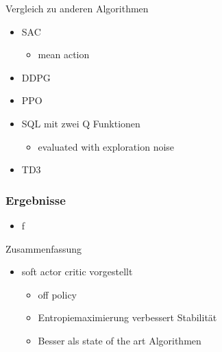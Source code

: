 \begin{frame}{Vergleich zu anderen Algorithmen}
    \begin{itemize}
        \item SAC
        \begin{itemize}
            \item mean action
        \end{itemize} 
        \item DDPG
        \item PPO
        \item SQL mit zwei Q Funktionen
        \begin{itemize}
            \item evaluated with exploration noise
        \end{itemize}
        \item TD3
    \end{itemize}
        
\end{frame}
\begin{frame}
    \frametitle{Ergebnisse}
    \begin{itemize}
        \item f
    \end{itemize}

    

\end{frame}


\begin{frame}{Zusammenfassung}
        \begin{itemize}
            \item soft actor critic vorgestellt
            \begin{itemize}
                \item off policy
                \item Entropiemaximierung verbessert Stabilität
                \item Besser als state of the art Algorithmen 
            \end{itemize} 
        \end{itemize}
\end{frame}

